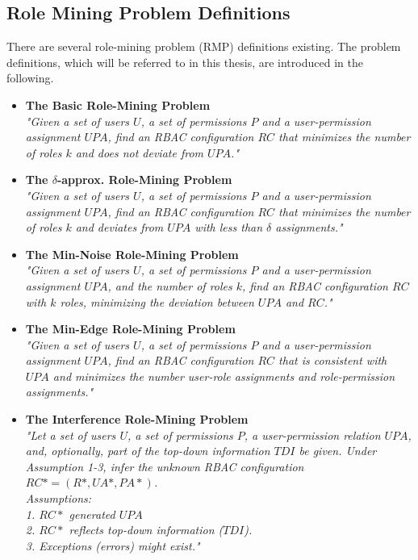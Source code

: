     \subsection{Role Mining Problem Definitions}
    \label{sec:roleMiningProblems}
    There are several role-mining problem (RMP) definitions existing. The problem definitions, which will be referred to in this thesis, are introduced in the following.
    \begin{itemize}
        \item \textbf{The Basic Role-Mining Problem}\cite{Vaidya:2007}\\
        \textit{"Given a set of users $U$, a set of permissions $P$ and a user-permission assignment $UPA$, find an RBAC configuration $RC$ that minimizes the number of roles $k$ and does not deviate from $UPA$."}
        \item \textbf{The $\delta$-approx. Role-Mining Problem}\cite{Vaidya:2007}\\
        \textit{"Given a set of users $U$, a set of permissions $P$ and a user-permission assignment $UPA$, find an RBAC configuration $RC$ that minimizes the number of roles $k$ and deviates from $UPA$ with less than $\delta$ assignments."}
        \item \textbf{The Min-Noise Role-Mining Problem}\cite{Vaidya:2007}\\
        \textit{"Given a set of users $U$, a set of permissions $P$ and a user-permission assignment $UPA$, and the number of roles $k$, find an RBAC configuration $RC$ with $k$ roles, minimizing the deviation between $UPA$ and $RC$."}
        \item \textbf{The Min-Edge Role-Mining Problem}\cite{4497438}\\
        \textit{"Given a set of users $U$, a set of permissions $P$ and a user-permission assignment $UPA$, find an RBAC configuration $RC$ that is consistent with $UPA$ and minimizes the number user-role assignments and role-permission assignments."}
        \item \textbf{The Interference Role-Mining Problem}\cite{Frank:2013}\\
        \textit{"Let a set of users $U$, a set of permissions $P$, a user-permission relation $UPA$, and, optionally, part of the top-down information $TDI$ be given. Under Assumption 1-3, infer the unknown RBAC configuration $RC*=(R*, UA*, PA*)$.\\
        Assumptions:\\
        1. $RC*$ generated $UPA$\\
        2. $RC*$ reflects top-down information ($TDI$).\\
        3. Exceptions (errors) might exist."}
    \end{itemize}
